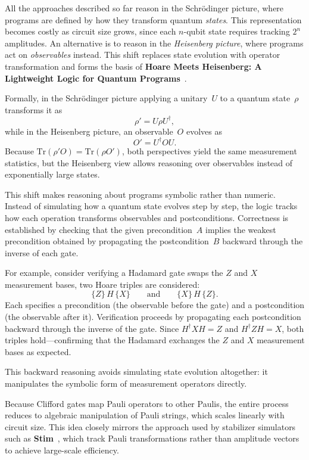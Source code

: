 \vspace{1em}

\vspace{1em}

All the approaches described so far reason in the Schrödinger picture, where programs are defined by how they transform quantum \emph{states}. 
This representation becomes costly as circuit size grows, since each $n$-qubit state requires tracking $2^n$ amplitudes. 
An alternative is to reason in the \emph{Heisenberg picture}, where programs act on \emph{observables} instead. 
This shift replaces state evolution with operator transformation and forms the basis of \textbf{Hoare Meets Heisenberg: A Lightweight Logic for Quantum Programs}~\cite{sundaram2022hoare}.

Formally, in the Schrödinger picture applying a unitary~$U$ to a quantum state~$\rho$ transforms it as
\[
  \rho' = U\rho U^\dagger,
\]
while in the Heisenberg picture, an observable~$O$ evolves as
\[
  O' = U^\dagger O U.
\]
Because $\mathrm{Tr}(\rho' O) = \mathrm{Tr}(\rho O')$, both perspectives yield the same measurement statistics, but the Heisenberg view allows reasoning over observables instead of exponentially large states.

This shift makes reasoning about programs symbolic rather than numeric. 
Instead of simulating how a quantum state evolves step by step, the logic tracks how each operation transforms observables and postconditions. 
Correctness is established by checking that the given precondition~$A$ implies the weakest precondition obtained by propagating the postcondition~$B$ backward through the inverse of each gate.

For example, consider verifying a Hadamard gate swaps the $Z$ and $X$ measurement bases, two Hoare triples are considered:
\[
\{Z\}\,H\,\{X\}
\qquad\text{and}\qquad
\{X\}\,H\,\{Z\}.
\]
Each specifies a precondition (the observable before the gate) and a postcondition (the observable after it). 
Verification proceeds by propagating each postcondition backward through the inverse of the gate. 
Since $H^\dagger X H = Z$ and $H^\dagger Z H = X$, both triples hold—confirming that the Hadamard exchanges the $Z$ and $X$ measurement bases as expected.


This backward reasoning avoids simulating state evolution altogether: it manipulates the symbolic form of measurement operators directly. 

Because Clifford gates map Pauli operators to other Paulis, the entire process reduces to algebraic manipulation of Pauli strings, which scales linearly with circuit size. 
This idea closely mirrors the approach used by stabilizer simulators such as \textbf{Stim}~\cite{gidney2021stim}, which track Pauli transformations rather than amplitude vectors to achieve large-scale efficiency.

